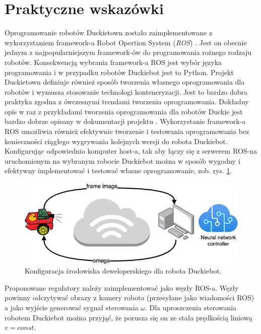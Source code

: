 \documentclass[conference]{IEEEtran}
\begin{document}

\section{Praktyczne wskazówki}\label{sec:practical-info}
Oprogramowanie robotów Duckietown zostało zaimplementowane z wykorzystaniem framework-a Robot Opertion System (\emph{ROS}) \cite{quigley2015programming}. Jest on obecnie jednym z najpopularniejszym framework-ów do programowania rożnego rodzaju robotów. Konsekwencją wybrania framework-a ROS jest wybór języka programowania i w przypadku robotów Duckiebot jest to Python. Projekt Duckietown definiuje również sposób tworzenia własnego oprogramowania dla robotów i wymusza stosowanie technologi konteneryzacji. Jest to bardzo dobra praktyka zgodna z ówczesnymi trendami tworzenia oprogramowania. Dokładny opis w raz z przykładami tworzenia oprogramowania dla robotów Duckie jest bardzo dobrze opisany w dokumentacji projektu \cite{Daniele:ff}. 
Wykorzystanie framework-a ROS umożliwia również efektywnie tworzenie i testowania oprogramowania bez konieczności ciągłego wygrywania kolejnych wersji do robota Duckiebot. Konfigurując odpowiednio komputer host-a, tak aby łączy się z serwerem ROS-na uruchomionym na wybranym robocie Duckiebot można w sposób wygodny i efektywny implementować i testować własne oprogramowanie, zob. rys. \ref{fig:env-develop}.

\begin{figure}[h]
    \centering
    \includegraphics[width=.8\columnwidth]{controll_schema2}
    \caption{Konfiguracja środowiska deweloperskiego dla robota Duckiebot.}
    \label{fig:env-develop}
\end{figure}

Proponowane regulatory należy zaimplementować jako węzły ROS-a. Węzły powinny odczytywać obrazy z kamery robota (przesyłane jako wiadomości ROS) a jako wyjście generować sygnał sterowania $\omega$. Dla uproszczenia sterowania robotem Duckiebot można przyjąć, że porusza się on ze stała prędkością liniową $v=const$.
\end{document}
